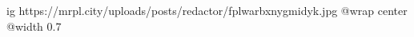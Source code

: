  
 
 
 
 

\ifcmt
  ig https://mrpl.city/uploads/posts/redactor/fplwarbxnygmidyk.jpg
  @wrap center
  @width 0.7
\fi
